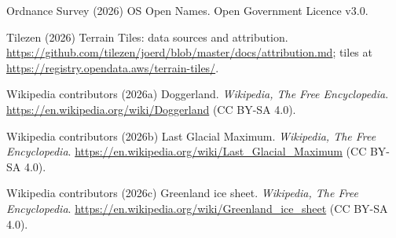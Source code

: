 \documentclass[11pt,a4paper]{article}
\begin{document}
\begin{small}
Ordnance Survey (2026) OS Open Names. Open Government Licence v3.0.

Tilezen (2026) Terrain Tiles: data sources and attribution. \url{https://github.com/tilezen/joerd/blob/master/docs/attribution.md}; tiles at \url{https://registry.opendata.aws/terrain-tiles/}.

Wikipedia contributors (2026a) Doggerland. \emph{Wikipedia, The Free Encyclopedia}. \url{https://en.wikipedia.org/wiki/Doggerland} (CC BY-SA 4.0).

Wikipedia contributors (2026b) Last Glacial Maximum. \emph{Wikipedia, The Free Encyclopedia}. \url{https://en.wikipedia.org/wiki/Last_Glacial_Maximum} (CC BY-SA 4.0).

Wikipedia contributors (2026c) Greenland ice sheet. \emph{Wikipedia, The Free Encyclopedia}. \url{https://en.wikipedia.org/wiki/Greenland_ice_sheet} (CC BY-SA 4.0).
\end{small}
\end{document}
